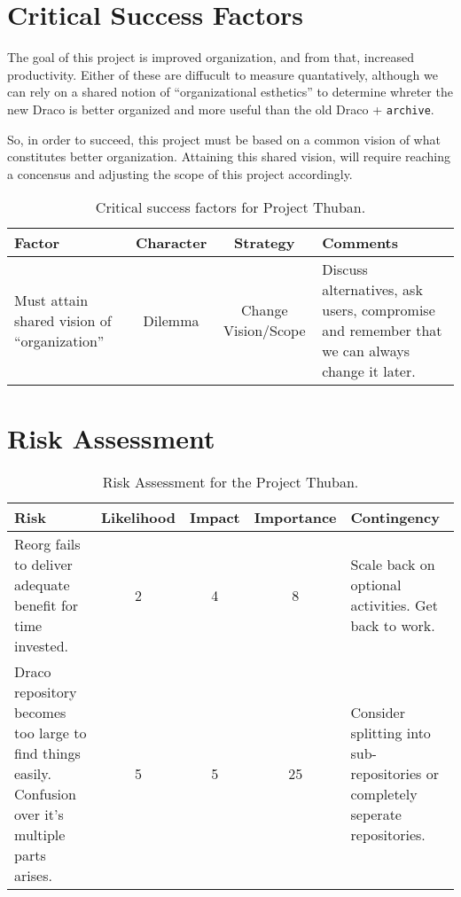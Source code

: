 \documentclass[11pt]{nmemo}
\begin{document}
\section*{Critical Success Factors}

The goal of this project is improved organization, and from that,
increased productivity. Either of these are diffucult to measure
quantatively, although we can rely on a shared notion of
``organizational esthetics'' to determine whreter the new Draco is
better organized and more useful than the old Draco + {\tt archive}.

So, in order to succeed, this project must be based on a common vision
of what constitutes better organization. Attaining this shared vision,
will require reaching a concensus and adjusting the scope of this
project accordingly. 

\begin{table}[ht]
  \begin{center}
    \caption{Critical success factors for Project Thuban.}
    \label{tab:critical-success}
    \begin{tabular}{|p{4.5cm}|c|c|p{4.5cm}|} 
    \hline
    Factor             &  Character   & Strategy & Comments \\ 
    \hline\hline
    Must attain shared vision of ``organization'' & 
    Dilemma & Change Vision/Scope &
    Discuss alternatives, ask users, compromise and remember that we
    can always change it later. \\ \hline
    \end{tabular}
  \end{center}
\end{table}

\section*{Risk Assessment}

\begin{table}[ht]
  \begin{center}
    \caption{Risk Assessment for the Project Thuban.}
    \label{tab:risk}
    \begin{tabular}{|p{4.5cm}|c|c|c|p{4.5cm}|} 
    \hline
    Risk & Likelihood & Impact & Importance & Contingency \\
    \hline\hline
    Reorg fails to deliver adequate benefit for time invested. &
    2 & 4 & 8 & 
    Scale back on optional activities. Get back to  work. \\ \hline
    Draco repository becomes too large to find things
    easily. Confusion over it's multiple parts arises. & 
    5 & 5 & 25 &
    Consider splitting into sub-repositories or completely seperate
    repositories. \\ \hline
    \end{tabular}
  \end{center}
\end{table}
\end{document}
